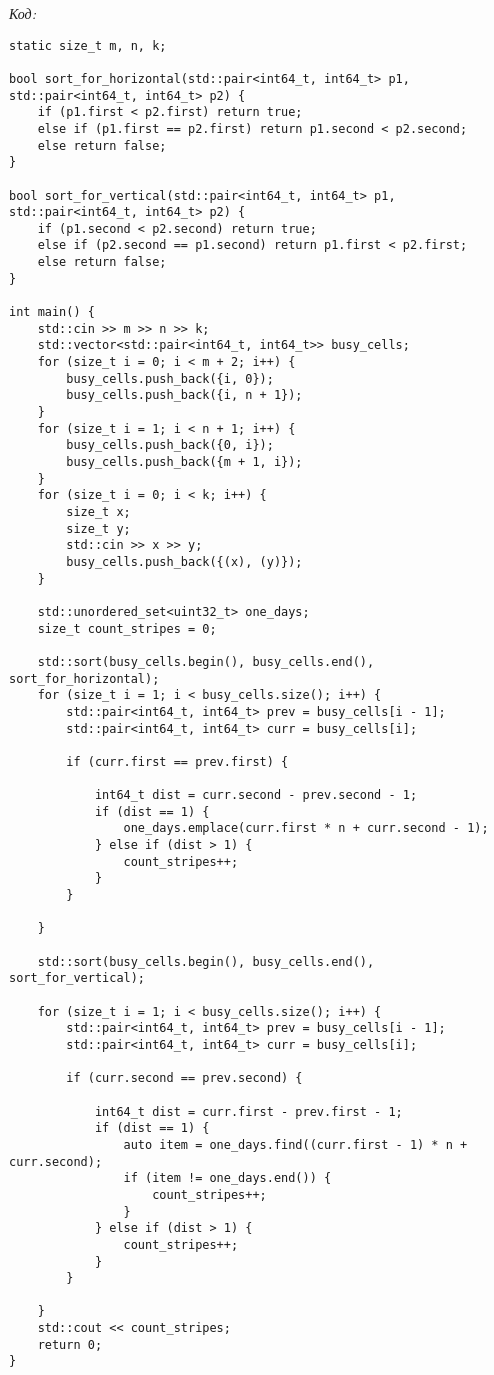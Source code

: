 \textit{Код:}
\small
\begin{center}
    \begin{verbatim}
static size_t m, n, k;

bool sort_for_horizontal(std::pair<int64_t, int64_t> p1, std::pair<int64_t, int64_t> p2) {
    if (p1.first < p2.first) return true;
    else if (p1.first == p2.first) return p1.second < p2.second;
    else return false;
}

bool sort_for_vertical(std::pair<int64_t, int64_t> p1, std::pair<int64_t, int64_t> p2) {
    if (p1.second < p2.second) return true;
    else if (p2.second == p1.second) return p1.first < p2.first;
    else return false;
}

int main() {
    std::cin >> m >> n >> k;
    std::vector<std::pair<int64_t, int64_t>> busy_cells;
    for (size_t i = 0; i < m + 2; i++) {
        busy_cells.push_back({i, 0});
        busy_cells.push_back({i, n + 1});
    }
    for (size_t i = 1; i < n + 1; i++) {
        busy_cells.push_back({0, i});
        busy_cells.push_back({m + 1, i});
    }
    for (size_t i = 0; i < k; i++) {
        size_t x;
        size_t y;
        std::cin >> x >> y;
        busy_cells.push_back({(x), (y)});
    }

    std::unordered_set<uint32_t> one_days;
    size_t count_stripes = 0;

    std::sort(busy_cells.begin(), busy_cells.end(), sort_for_horizontal);
    for (size_t i = 1; i < busy_cells.size(); i++) {
        std::pair<int64_t, int64_t> prev = busy_cells[i - 1];
        std::pair<int64_t, int64_t> curr = busy_cells[i];

        if (curr.first == prev.first) {

            int64_t dist = curr.second - prev.second - 1;
            if (dist == 1) {
                one_days.emplace(curr.first * n + curr.second - 1);
            } else if (dist > 1) {
                count_stripes++;
            }
        }

    }

    std::sort(busy_cells.begin(), busy_cells.end(), sort_for_vertical);

    for (size_t i = 1; i < busy_cells.size(); i++) {
        std::pair<int64_t, int64_t> prev = busy_cells[i - 1];
        std::pair<int64_t, int64_t> curr = busy_cells[i];

        if (curr.second == prev.second) {

            int64_t dist = curr.first - prev.first - 1;
            if (dist == 1) {
                auto item = one_days.find((curr.first - 1) * n + curr.second);
                if (item != one_days.end()) {
                    count_stripes++;
                }
            } else if (dist > 1) {
                count_stripes++;
            }
        }

    }
    std::cout << count_stripes;
    return 0;
}
    \end{verbatim}
\end{center}